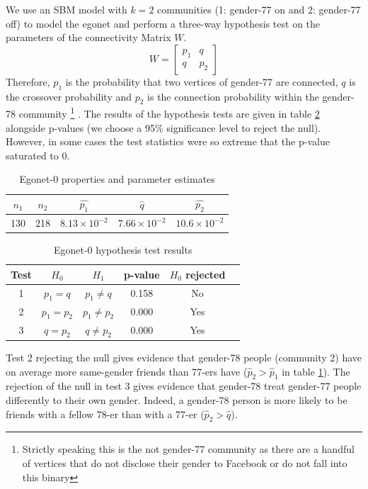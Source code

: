 \documentclass[11pt]{article}
\begin{document}
\begin{multicols*}{2}
We use an SBM model with $k=2$ communities (1: gender-77 on and 2: gender-77 off) to model the egonet and perform a three-way hypothesis test on the parameters of the connectivity Matrix $W$.
%
\begin{equation}
	W = \begin{bmatrix}
		p_1 & q \\
		q & p_2
	\end{bmatrix}
\end{equation}
%
Therefore, $p_1$ is the probability that two vertices of gender-77 are connected, $q$ is the crossover probability and $p_2$ is the connection probability within the gender-78 community
\footnote{Strictly speaking this is the not gender-77 community as there are a handful of vertices that do not disclose their gender to Facebook or do not fall into this binary}
. The results of the hypothesis tests are given in table \ref{tab:egonet-0-hyp-tests} alongside p-values (we choose a 95\% significance level to reject the null). However, in some cases the test statistics were so extreme that the p-value saturated to 0.
%
\begin{table}[H]
	\centering
	\begin{tabular}{c c c c c}
		$n_1$                & $n_2$                & $\hat{p_1}$ & $\hat{q}$ & $\hat{p_2}$       \\ \hline
		130 & 218 & $8.13 \times 10^{-2}$ & $7.66 \times 10^{-2}$ & $10.6 \times 10^{-2}$
	\end{tabular}
	\caption{Egonet-0 properties and parameter estimates}
	\label{tab:egonet-0-props}
\end{table}
%
\begin{table}[H]
	\centering
	\begin{tabular}{cccccc}
		Test & $H_0$                & $H_1$                & p-value & $H_0$ rejected       \\ \hline
		1    & $p_1 = q$            & $p_1 \neq q$         & 0.158 &  No                \\
		2    & $p_1 = p_2$ & $p_1 \neq p_2$ & 0.000 & Yes \\
		3    & $q = p_2$ & $q \neq p_2$ &  0.000 & Yes
	\end{tabular}
	\caption{Egonet-0 hypothesis test results}
	\label{tab:egonet-0-hyp-tests}
\end{table}

Test 2 rejecting the null gives evidence that gender-78 people (community 2) have on average more same-gender friends than 77-ers have ($\hat{p}_2 > \hat{p}_1$ in table \ref{tab:egonet-0-props}). The rejection of the null in test 3 gives evidence that gender-78 treat gender-77 people differently to their own gender. Indeed, a gender-78 person is more likely to be friends with a fellow 78-er than with a 77-er ($\hat{p}_2 > \hat{q}$).


\end{multicols*}
\end{document}
